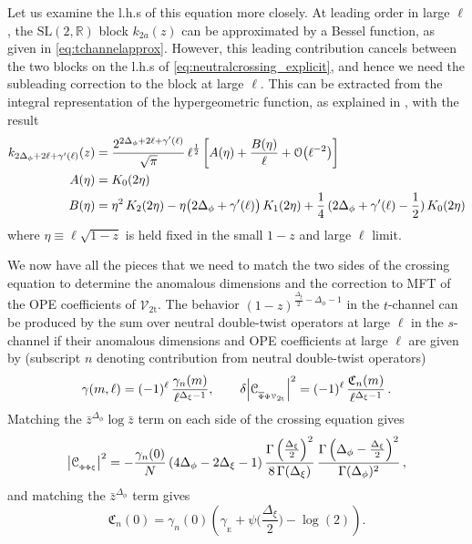 \documentclass[11pt]{article}
\newcommand{\zb}{\bar{z}}
\newcommand{\Phib}{\overline{\Phi}}
\newcommand{\cope}[1]{\mathcal{C}_{_{#1}}}
\begin{document}
%
Let us examine the l.h.s of this equation more closely. At leading order in large $\ell$, the $\mathrm{SL}(2,\mathbb{R})$ block $k_{2a}(z)$ can be approximated by a Bessel function, as given in \eqref{eq:tchannelapprox}. However, this leading contribution cancels between the two blocks on the l.h.s of \eqref{eq:neutralcrossing_explicit}, and hence we need the subleading correction to the block at large $\ell$. This can be extracted from the integral representation of the hypergeometric function, as explained in \cite{Alday:2015eya}, with the result 
%
\begin{equation}\label{eq:1dblocksubleading}
\begin{split}
k_{2\Delta_{\phi}+2\ell+\gamma'(\ell)}(z)  
&= 
  \frac{2^{2\Delta_{\phi}+2\ell+\gamma'(\ell)}}{\sqrt{\pi}} \, \ell^{\frac{1}{2}} \left[ A(\eta) + \frac{B(\eta)}{\ell} + \order{\ell^{-2}}  \right] \\
A(\eta) 
&= 
   K_{0}(2\eta) \\ 
B(\eta)
&=
  \eta^{2}\, K_2(2\eta)-\eta\big(2\Delta_{\phi}+\gamma'(\ell)\big) \, K_{1}(2\eta)+
   \frac{1}{4} \, (2\Delta_{\phi}+\gamma'(\ell)-\frac{1}{2}) \, K_{0}(2\eta) 
\end{split}
\end{equation}
%
where $\eta \equiv \ell\sqrt{1-z}$ is held fixed in the small $1-z$ and large $\ell$ limit.

We now have all the pieces that we need to match the two sides of the crossing equation to determine the anomalous dimensions and the correction to MFT of the OPE coefficients of $\mathcal{V}_{\mathrm{2t}}$. The behavior $(1-z)^{\frac{\Delta_{\xi}}{2}-\Delta_{\phi}-1}$ in the $t$-channel can be produced by the sum over neutral double-twist operators at large $\ell$ in the $s$-channel if their anomalous dimensions and OPE coefficients at large $\ell$ are given by (subscript $n$ denoting contribution from neutral double-twist operators)
%
\begin{equation}\label{eqn:anomOPEneutral}
\gamma(m,\ell) = (-1)^{\ell}\, \frac{\gamma_n(m)}{\ell^{\Delta_{\xi}-1}}, \qquad 
\delta \abs{\cope{\Phib\Phi\mathcal{V}_{\mathrm{2t}}}}^{2} = (-1)^{\ell} \, \frac{\mathfrak{C}_n(m)}{\ell^{\Delta_{\xi}-1}} \,.
\end{equation}
%
Matching the $\zb^{\Delta_{\phi}}\log \zb$ term on each side of the crossing equation gives
%
\begin{equation}\label{eq:xiOPEcoeff}
\abs{\cope{\Phi\Phi \xi}}^{2} 
= -\frac{\gamma_n(0)}{N} \,    (4\Delta_{\phi}-2\Delta_{\xi}-1)\, 
  \frac{\Gamma\left(\frac{\Delta_{\xi}}{2}\right)^2}{8\,\Gamma(\Delta_{\xi})}
\, 
  \frac{ \Gamma\left(\Delta_{\phi}-\frac{\Delta_{\xi}}{2}\right)^{2}}{\Gamma(\Delta_{\phi})^2 } \,, 
\end{equation}
%
and matching the $\zb^{\Delta_{\phi}}$ term gives
%
\begin{equation}\label{eqn:neutraldoubletwOPE}
\mathfrak{C}_n(0) = \gamma_n(0) 
  \left(\gamma_{_\text{E}}+\psi\bigg(\frac{\Delta_{\xi}}{2}\bigg)-\log(2)\right) .
\end{equation}
%
\end{document}
